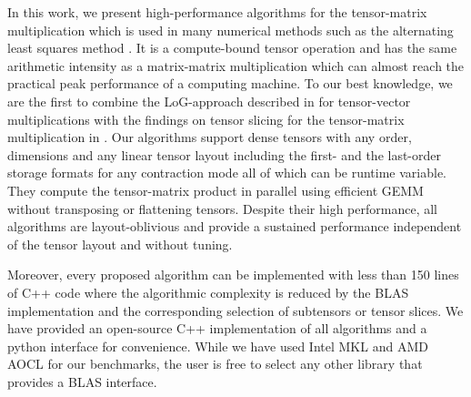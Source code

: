 In this work, we present high-performance algorithms for the tensor-matrix multiplication which is used in many numerical methods such as the alternating least squares method \citep{lee:2018:fundamental, kolda:2009:decompositions}.
It is a compute-bound tensor operation and has the same arithmetic intensity as a matrix-matrix multiplication which can almost reach the practical peak performance of a computing machine.
To our best knowledge, we are the first to combine the LoG-approach described in \citep{bassoy:2019:ttv, pawlowski:2019:morton.tensor.computations} for tensor-vector multiplications with the findings on tensor slicing for the tensor-matrix multiplication in \citep{li:2015:input}.
Our algorithms support dense tensors with any order, dimensions and any linear tensor layout including the first- and the last-order storage formats for any contraction mode all of which can be runtime variable.
They compute the tensor-matrix product in parallel using efficient GEMM without transposing or flattening tensors.
Despite their high performance, all algorithms are layout-oblivious and provide a sustained performance independent of the tensor layout and without tuning.

Moreover, every proposed algorithm can be implemented with less than 150 lines of C++ code where the algorithmic complexity is reduced by the BLAS implementation and the corresponding selection of subtensors or tensor slices.
We have provided an open-source C++ implementation of all algorithms and a python interface for convenience.
While we have used Intel MKL and AMD AOCL for our benchmarks, the user is free to select any other library that provides a BLAS interface.

